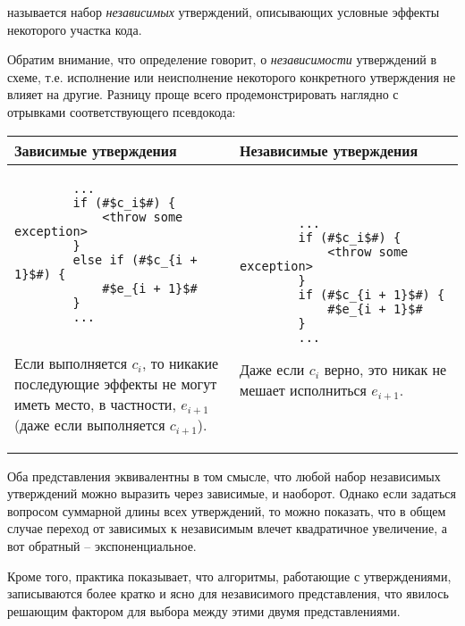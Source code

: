 \begin{definition}
     называется набор \emph{независимых} утверждений, описывающих условные эффекты некоторого участка кода.
\end{definition}

Обратим внимание, что определение говорит, о \emph{независимости} утверждений в схеме, т.е. исполнение или неисполнение некоторого конкретного утверждения не влияет на другие. Разницу проще всего продемонстрировать наглядно с отрывками соответствующего псевдокода:

\bigskip

\setlength{\tabcolsep}{12pt}
\begin{tabular}{p{0.5\linewidth} | p{0.5\linewidth}}
    
    Зависимые утверждения & Независимые утверждения \\\hline
    
    \begin{verbatim}
        ...
        if (#$c_i$#) {
            <throw some exception>
        } 
        else if (#$c_{i + 1}$#) {
            #$e_{i + 1}$#
        } 
        ...
       
    \end{verbatim}
    
    Если выполняется $c_i$, то никакие последующие эффекты не могут иметь место, в частности, $e_{i + 1}$ (даже если выполняется ${c_{i + 1}}$).
    
    &
      
    \begin{verbatim}
        ...
        if (#$c_i$#) {
            <throw some exception>
        } 
        if (#$c_{i + 1}$#) {
            #$e_{i + 1}$#
        } 
        ... 
    \end{verbatim}
    
    Даже если $c_i$ верно, это никак не мешает исполниться $e_{i + 1}$.
\end{tabular}
\setlength{\tabcolsep}{6pt} 

Оба представления эквивалентны в том смысле, что любой набор независимых утверждений можно выразить через зависимые, и наоборот. Однако если задаться вопросом суммарной длины всех утверждений, то можно показать, что в общем случае переход от зависимых к независимым влечет квадратичное увеличение, а вот обратный -- экспоненциальное. 

Кроме того, практика показывает, что алгоритмы, работающие с утверждениями, записываются более кратко и ясно для независимого представления, что явилось решающим фактором для выбора между этими двумя представлениями. 


